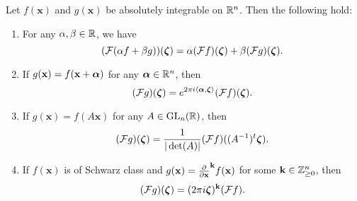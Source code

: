      \begin{proposition}\label{prop:Fourier_transform_properties}
        Let $f(\mathbf{x})$ and $g(\mathbf{x})$ be absolutely integrable on $\mathbb{R}^{n}$. Then the following hold:
        \begin{enumerate}[label=(\roman*)]
          \item For any $\alpha,\beta \in \mathbb{R}$, we have
          \[
            (\mathcal{F}(\alpha f+\beta g))(\boldsymbol{\zeta}) = \alpha(\mathcal{F}f)(\boldsymbol{\zeta})+\beta(\mathcal{F}g)(\boldsymbol{\zeta}).
          \]
          \item If $g(\mathbf{x}) = f(\mathbf{x}+\boldsymbol{\alpha})$ for any $\boldsymbol{\alpha} \in \mathbb{R}^{n}$, then
          \[
            (\mathcal{F}g)(\boldsymbol{\zeta}) = e^{2\pi i\langle\boldsymbol{\alpha},\boldsymbol{\zeta}\rangle}(\mathcal{F}f)(\boldsymbol{\zeta}).
          \]
          \item If $g(\mathbf{x}) = f(A\mathbf{x})$ for any $A \in \mathrm{GL}_{n}(\mathbb{R})$, then
          \[
            (\mathcal{F}g)(\boldsymbol{\zeta}) = \frac{1}{|\det(A)|}(\mathcal{F}f)((A^{-1})^{t}\boldsymbol{\zeta}).
          \]
          \item If $f(\mathbf{x})$ is of Schwarz class and $g(\mathbf{x}) = \frac{\partial}{\partial \mathbf{x}}^{\mathbf{k}}f(\mathbf{x})$ for some $\mathbf{k} \in \mathbb{Z}_{\ge 0}^{n}$, then
          \[
            (\mathcal{F}g)(\boldsymbol{\zeta}) = (2\pi i\boldsymbol{\zeta})^{\mathbf{k}}(\mathcal{F}f).
          \]
        \end{enumerate}
      \end{proposition}
